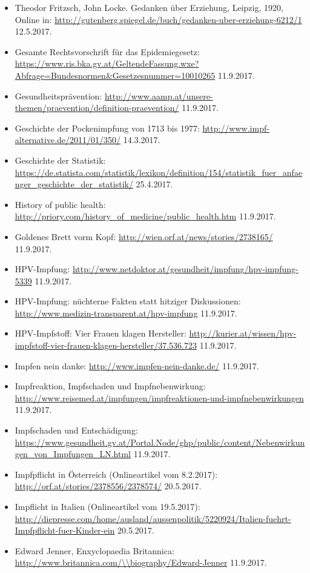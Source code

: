 \documentclass[
    a4paper,
    12pt,
    hyphens,
    chapterprefix=true,
    headheight=33pt,
    footheight=29pt,
    headings=optiontohead,
]{scrartcl}
\begin{document}
{\begin{itemize}
\item{Theodor Fritzsch, John Locke. Gedanken über Erziehung, Leipzig, 1920, Online in: \url{http://gutenberg.spiegel.de/buch/gedanken-uber-erziehung-6212/1} 12.5.2017.}
\item{Gesamte Rechtsvorschrift für das Epidemiegesetz: \url{https://www.ris.bka.gv.at/GeltendeFassung.wxe?Abfrage=Bundesnormen&Gesetzesnummer=10010265} 11.9.2017.}
\item{Gesundheitsprävention: \url{http://www.aamp.at/unsere-themen/praevention/definition-praevention/} 11.9.2017.}
\item{Geschichte der Pockenimpfung von 1713 bis 1977: \url{http://www.impf-alternative.de/2011/01/350/} 14.3.2017.}
\item{Geschichte der Statistik: \url{https://de.statista.com/statistik/lexikon/definition/154/statistik_fuer_anfaenger_geschichte_der_statistik/} 25.4.2017.}
\item{History of public health: \url{http://priory.com/history_of_medicine/public_health.htm} 11.9.2017.}
\item{Goldenes Brett vorm Kopf: \url{http://wien.orf.at/news/stories/2738165/} 11.9.2017.}
\item{HPV-Impfung: \url{http://www.netdoktor.at/gesundheit/impfung/hpv-impfung-5339} 11.9.2017.}
\item{HPV-Impfung: nüchterne Fakten statt hitziger Diskussionen: \url{http://www.medizin-transparent.at/hpv-impfung} 11.9.2017.}
\item{HPV-Impfstoff: Vier Frauen klagen Hersteller: \url{http://kurier.at/wissen/hpv-impfstoff-vier-frauen-klagen-hersteller/37.536.723} 11.9.2017.}
\item{Impfen nein danke: \url{http://www.impfen-nein-danke.de/} 11.9.2017.}
\item{Impfreaktion, Impfschaden und Impfnebenwirkung: \url{http://www.reisemed.at/impfungen/impfreaktionen-und-impfnebenwirkungen} 11.9.2017.}
\item{Impfschaden und Entschädigung: \url{https://www.gesundheit.gv.at/Portal.Node/ghp/public/content/Nebenwirkungen_von_Impfungen_LN.html} 11.9.2017.}
\item{Impfpflicht in Österreich (Onlineartikel vom 8.2.2017): \url{http://orf.at/stories/2378556/2378574/} 20.5.2017.}
\item{Impflicht in Italien (Onlineartikel vom 19.5.2017): \url{http://diepresse.com/home/ausland/aussenpolitik/5220924/Italien-fuehrt-Impfpflicht-fuer-Kinder-ein} 20.5.2017.}
\item{Edward Jenner, Enxyclopaedia Britannica: \url{http://www.britannica.com/\\biography/Edward-Jenner} 11.9.2017.}

\end{itemize}}
\end{document}
